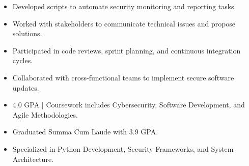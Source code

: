 \par\smallskip
\noindent
\begin{minipage}{20cm}
  \begin{minipage}{9.75cm}
    \begin{itemize}
      \item Developed scripts to automate security monitoring and reporting tasks.
      \item Worked with stakeholders to communicate technical issues and propose solutions.
    \end{itemize}
  \end{minipage}
  \hfill
  \begin{minipage}{9.75cm}
    \begin{itemize}
      \item Participated in code reviews, sprint planning, and continuous integration cycles.
      \item Collaborated with cross-functional teams to implement secure software updates.
    \end{itemize}
  \end{minipage}
\end{minipage}
\par\smallskip
\divider

\begin{itemize}
  \item 4.0 GPA | Coursework includes Cybersecurity, Software Development, and Agile Methodologies.
\end{itemize}
\divider

\begin{itemize}
  \item Graduated Summa Cum Laude with 3.9 GPA.
  \item Specialized in Python Development, Security Frameworks, and System Architecture.
\end{itemize}

\noindent
\begin{minipage}{20cm}
\end{minipage}


